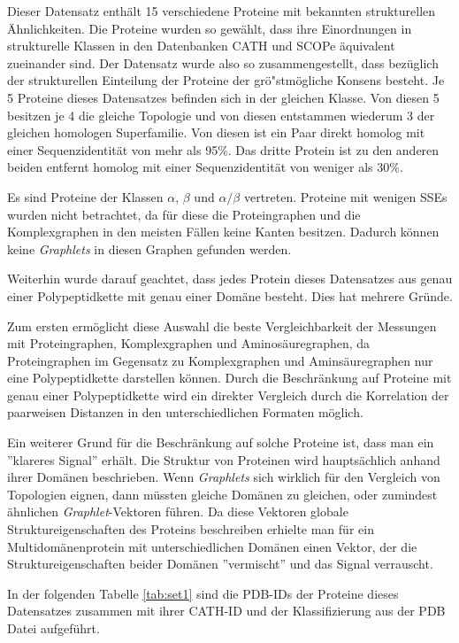 \documentclass{report}
\begin{document}
Dieser Datensatz enth\"alt 15 verschiedene Proteine mit bekannten strukturellen \"Ahnlichkeiten. Die Proteine wurden so gew\"ahlt, dass ihre Einordnungen in strukturelle Klassen in den Datenbanken CATH und SCOPe \"aquivalent zueinander sind.
Der Datensatz wurde also so zusammengestellt, dass bez\"uglich der strukturellen Einteilung der Proteine der gr\"o"stm\"ogliche Konsens besteht.
Je 5 Proteine dieses Datensatzes befinden sich in der gleichen Klasse. Von diesen 5 besitzen je 4 die gleiche Topologie und von diesen entstammen wiederum 3 der gleichen homologen Superfamilie. Von diesen ist ein Paar direkt homolog mit einer Sequenzidentit\"at von mehr als 95\%. Das dritte Protein ist zu den anderen beiden entfernt homolog mit einer Sequenzidentit\"at von weniger als 30\%.

Es sind Proteine der Klassen $\alpha$, $\beta$ und $\alpha/\beta$ vertreten. Proteine mit wenigen SSEs wurden nicht betrachtet, da f\"ur diese die Proteingraphen und die Komplexgraphen in den meisten F\"allen keine Kanten besitzen. Dadurch k\"onnen keine \textit{Graphlets} in diesen Graphen gefunden werden.

Weiterhin wurde darauf geachtet, dass jedes Protein dieses Datensatzes aus genau einer Polypeptidkette mit genau einer Dom\"ane besteht. Dies hat mehrere Gr\"unde.

Zum ersten erm\"oglicht diese Auswahl die beste Vergleichbarkeit der Messungen mit Proteingraphen, Komplexgraphen und Aminos\"auregraphen, da Proteingraphen im Gegensatz zu Komplexgraphen und Amins\"auregraphen nur eine Polypeptidkette darstellen k\"onnen. Durch die Beschr\"ankung auf Proteine mit genau einer Polypeptidkette wird ein direkter Vergleich durch die Korrelation der paarweisen Distanzen in den unterschiedlichen Formaten m\"oglich.

Ein weiterer Grund f\"ur die Beschr\"ankung auf solche Proteine ist, dass man ein ''klareres Signal'' erh\"alt. Die Struktur von Proteinen wird haupts\"achlich anhand ihrer Dom\"anen beschrieben. Wenn \textit{Graphlets} sich wirklich f\"ur den Vergleich von Topologien eignen, dann m\"ussten gleiche Dom\"anen zu gleichen, oder zumindest \"ahnlichen \textit{Graphlet}-Vektoren f\"uhren.
Da diese Vektoren globale Struktureigenschaften des Proteins beschreiben erhielte man f\"ur ein Multidom\"anenprotein mit unterschiedlichen Dom\"anen einen Vektor, der die Struktureigenschaften beider Dom\"anen ''vermischt'' und das Signal verrauscht.


In der folgenden Tabelle \ref{tab:set1} sind die PDB-IDs der Proteine dieses Datensatzes zusammen mit ihrer CATH-ID und der Klassifizierung aus der PDB Datei aufgef\"uhrt.
\end{document}
